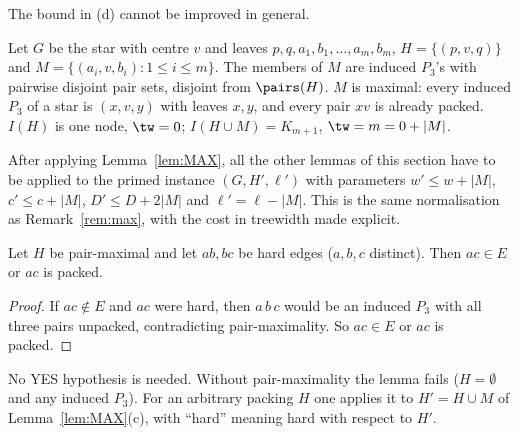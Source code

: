 The bound in (d) cannot be improved in general.
\begin{example}[Tightness of (d)]\label{ex:maxtight}
Let $G$ be the star with centre $v$ and leaves $p,q,a_1,b_1,\dots,a_m,b_m$, $H=\{(p,v,q)\}$ and $M=\{(a_i,v,b_i):1\le i\le m\}$. The members of $M$ are induced $P_3$'s with pairwise disjoint pair sets, disjoint from $\pairs(H)$. $M$ is maximal: every induced $P_3$ of a star is $(x,v,y)$ with leaves $x,y$, and every pair $xv$ is already packed. $I(H)$ is one node, $\tw=0$; $I(H\cup M)=K_{m+1}$, $\tw=m=0+|M|$.
\end{example}
After applying Lemma~\ref{lem:MAX}, all the other lemmas of this section have to be applied to the primed instance $(G,H',\ell')$ with parameters $w'\le w+|M|$, $c'\le c+|M|$, $D'\le D+2|M|$ and $\ell'=\ell-|M|$. This is the same normalisation as Remark~\ref{rem:max}, with the cost in treewidth made explicit.

\begin{lemma}\label{lem:HE}
Let $H$ be pair-maximal and let $ab,bc$ be hard edges ($a,b,c$ distinct). Then $ac\in E$ or $ac$ is packed.
\end{lemma}
\begin{proof}
If $ac\notin E$ and $ac$ were hard, then $a\,b\,c$ would be an induced $P_3$ with all three pairs unpacked, contradicting pair-maximality. So $ac\in E$ or $ac$ is packed.
\end{proof}
No YES hypothesis is needed. Without pair-maximality the lemma fails ($H=\emptyset$ and any induced $P_3$). For an arbitrary packing $H$ one applies it to $H'=H\cup M$ of Lemma~\ref{lem:MAX}(c), with ``hard'' meaning hard with respect to $H'$.

